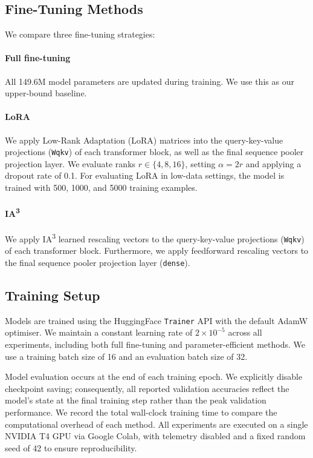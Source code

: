 \documentclass[11pt]{article}
\begin{document}
\subsection{Fine-Tuning Methods}

We compare three fine-tuning strategies:

\paragraph{Full fine-tuning} All 149.6M model parameters are updated
during training. We use this as our upper-bound baseline.

\paragraph{LoRA} We apply Low-Rank Adaptation (LoRA) matrices into the query-key-value projections (\texttt{Wqkv}) of each transformer block, as well as the final sequence pooler projection layer. We evaluate ranks $r \in \{4, 8, 16\}$, setting $\alpha = 2r$ and applying a dropout rate of 0.1. For evaluating LoRA in low-data settings, the model is trained with 500, 1000, and 5000 training examples.

\paragraph{IA\textsuperscript{3}} We apply IA\textsuperscript{3} learned rescaling vectors to the query-key-value projections (\texttt{Wqkv}) of each transformer block. Furthermore, we apply feedforward rescaling vectors to the final sequence pooler projection layer (\texttt{dense}).

\subsection{Training Setup}

Models are trained using the HuggingFace \texttt{Trainer} API with the default AdamW optimiser. We maintain a constant learning rate of $2 \times 10^{-5}$ across all experiments, including both full fine-tuning and parameter-efficient methods. We use a training batch size of 16 and an evaluation batch size of 32. 

Model evaluation occurs at the end of each training epoch. We explicitly disable checkpoint saving; consequently, all reported validation accuracies reflect the model's state at the final training step rather than the peak validation performance. We record the total wall-clock training time to compare the computational overhead of each method. All experiments are executed on a single NVIDIA T4 GPU via Google Colab, with telemetry disabled and a fixed random seed of 42 to ensure reproducibility.
\end{document}
